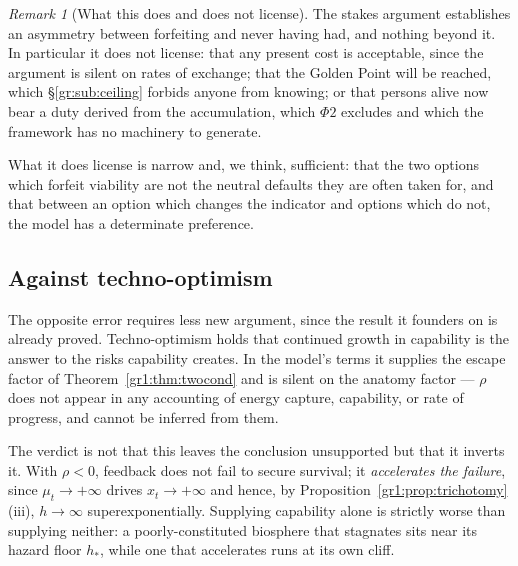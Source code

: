 \documentclass[11pt]{article}
\numberwithin{equation}{section}
\theoremstyle{plain}
\theoremstyle{definition}
\theoremstyle{remark}
\newtheorem{remark}[theorem]{Remark}
\begin{document}
\begin{remark}[What this does and does not license]\label{hr:rem:stakeslimit}
The stakes argument establishes an asymmetry between forfeiting and
never having had, and nothing beyond it. In particular it does not
license: that any present cost is acceptable, since the argument is
silent on rates of exchange; that the Golden Point will be reached,
which \S\ref{gr:sub:ceiling} forbids anyone from knowing; or that
persons alive now bear a duty derived from the accumulation, which
$\Phi2$ excludes and which the framework has no machinery to generate.

What it does license is narrow and, we think, sufficient: that the two
options which forfeit viability are not the neutral defaults they are
often taken for, and that between an option which changes the indicator
and options which do not, the model has a determinate preference.
\end{remark}

\subsection{Against techno-optimism}\label{hr:sub:optimism}

The opposite error requires less new argument, since the result it
founders on is already proved. Techno-optimism holds that continued growth in capability is the answer
to the risks capability creates. In the model's terms it supplies the
escape factor of Theorem~\ref{gr1:thm:twocond} and is silent on the
anatomy factor --- $\rho$ does not appear in any accounting of energy
capture, capability, or rate of progress, and cannot be inferred from
them.

The verdict is not that this leaves the conclusion unsupported but that
it inverts it. With $\rho<0$, feedback does not fail to secure survival;
it \emph{accelerates the failure}, since $\mu_t\to+\infty$ drives
$x_t\to+\infty$ and hence, by
Proposition~\ref{gr1:prop:trichotomy}(iii), $h\to\infty$
superexponentially. Supplying capability alone is strictly worse than
supplying neither: a poorly-constituted biosphere that stagnates sits
near its hazard floor $h_\ast$, while one that accelerates runs at its
own cliff.
\end{document}
